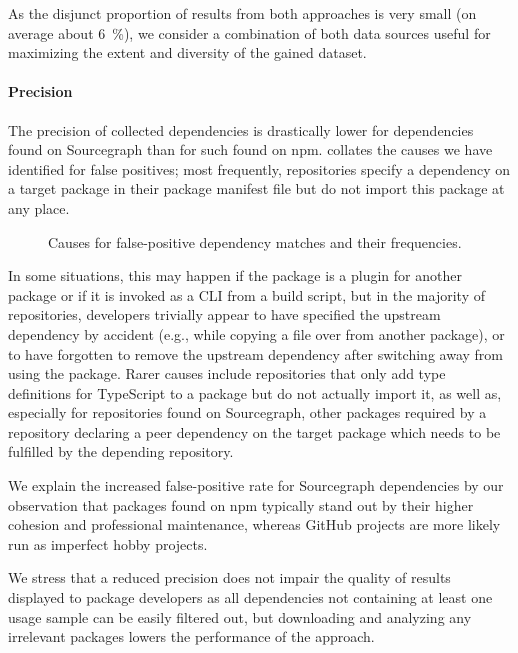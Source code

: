 As the disjunct proportion of results from both approaches is very small (on average about \SI{6}{\percent}), we consider a combination of both data sources useful for maximizing the extent and diversity of the gained dataset.

\paragraph{Precision}
\label{sec:evaluation/resqu1/precision}

The precision of collected dependencies is drastically lower for dependencies found on Sourcegraph than for such found on npm.
 collates the causes we have identified for false positives; most frequently, repositories specify a dependency on a target package in their package manifest file but do not import this package at any place.

\begin{figure}
	\centering
	\small
	\renewcommand\theadfont{\small}
	

	\caption{Causes for false-positive dependency matches and their frequencies.}
	\label{fig:evaluation/resqu1/fp_causes}
\end{figure}

In some situations, this may happen if the package is a plugin for another package or if it is invoked as a CLI from a build script, but in the majority of repositories, developers trivially appear to have specified the upstream dependency by accident (e.g., while copying a  file over from another package), or to have forgotten to remove the upstream dependency after switching away from using the package.
Rarer causes include repositories that only add type definitions for TypeScript to a package but do not actually import it, as well as, especially for repositories found on Sourcegraph, other packages required by a repository declaring a peer dependency on the target package which needs to be fulfilled by the depending repository.

We explain the increased false-positive rate for Sourcegraph dependencies by our observation that packages found on npm typically stand out by their higher cohesion and professional maintenance, whereas GitHub projects are more likely run as imperfect hobby projects.

We stress that a reduced precision does not impair the quality of results displayed to package developers as all dependencies not containing at least one
usage sample can be easily filtered out, but downloading and analyzing any irrelevant packages lowers the performance of the approach.

